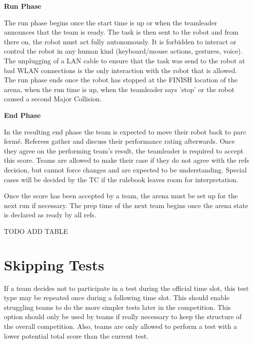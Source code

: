 \textbf{Run Phase}

The run phase begins once the start time is up or when the teamleader announces that the team is ready. 
The task is then sent to the robot and from there on, the robot must act fully autonomously. It is forbidden to interact or control the robot in any human kind (keyboard/mouse actions, gestures, voice). The unplugging of a LAN cable to ensure that the task was send to the robot at bad WLAN connections is the only interaction with the robot that is allowed.
The run phase ends once the robot has stopped at the FINISH location of the arena, when the run time is up, when the teamleader says 'stop' or the robot caused a second Major Collision.

\textbf{End Phase}

In the resulting end phase the team is expected to move their robot back to parc ferm\'e.
Referees gather and discuss their performance rating afterwards.
Once they agree on the performing team's result, 
the teamleader is required to accept this score. 
Teams are allowed to make their case if they do not agree with the refs decision,
but cannot force changes and are expected to be understanding.
Special cases will be decided by the TC if the rulebook leaves room for interpretation.

Once the score has been accepted by a team,
the arena must be set up for the next run if necessary.
The prep time of the next team begins once the arena state is declared as ready by all refs.

TODO ADD TABLE 

\section{Skipping Tests}

If a team decides not to participate in a test during the official time slot, this test type may be repeated once during a following time slot. This should enable struggling teams to do the more simpler tests later in the competition. This option should only be used by teams if really necessary to keep the structure of the overall competition. Also, teams are only allowed to perform a test with a lower potential total score than the current test.

